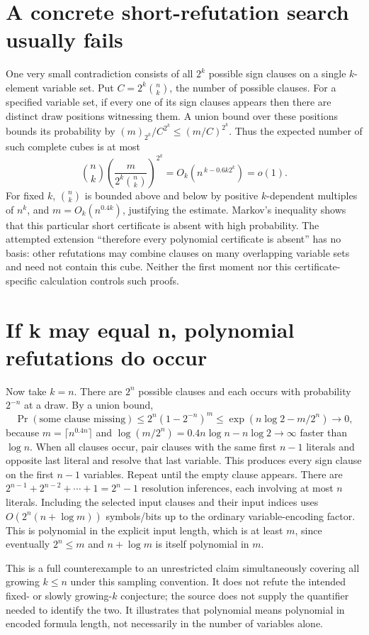 \documentclass[11pt]{article}
\begin{document}
\section{A concrete short-refutation search usually fails}
One very small contradiction consists of all $2^k$ possible sign clauses
on a single $k$-element variable set. Put
$C=2^k\binom nk$, the number of possible clauses. For a specified
variable set, if every one of its sign clauses appears then there are
distinct draw positions witnessing them. A union bound over these
positions bounds its probability by $(m)_{2^k}/C^{2^k}\le(m/C)^{2^k}$.
Thus the expected number of such complete cubes is at most
\[
\binom nk\left(\frac{m}{2^k\binom nk}\right)^{2^k}
=O_k\!\left(n^{\,k-0.6k2^k}\right)=o(1).
\]
For fixed $k$, $\binom nk$ is bounded above and below by positive
$k$-dependent multiples of $n^k$, and $m=O_k(n^{0.4k})$, justifying
the estimate. Markov's inequality shows that this particular short
certificate is absent with high probability. The attempted extension
``therefore every polynomial certificate is absent'' has no basis:
other refutations may combine clauses on many overlapping variable sets
and need not contain this cube. Neither the first moment nor this
certificate-specific calculation controls such proofs.

\section{If k may equal n, polynomial refutations do occur}
Now take $k=n$. There are $2^n$ possible clauses and each occurs with
probability $2^{-n}$ at a draw. By a union bound,
\[
\Pr(\text{some clause missing})
\le 2^n(1-2^{-n})^m
\le\exp(n\log2-m/2^n)\longrightarrow0,
\]
because $m=\lceil n^{0.4n}\rceil$ and
$\log(m/2^n)=0.4n\log n-n\log2\to\infty$ faster than $\log n$.
When all clauses occur, pair clauses with the same first $n-1$ literals
and opposite last literal and resolve that last variable. This produces
every sign clause on the first $n-1$ variables. Repeat until the empty
clause appears. There are
$2^{n-1}+2^{n-2}+\cdots+1=2^n-1$ resolution inferences, each involving
at most $n$ literals. Including the selected input clauses and their
input indices uses $O(2^n(n+\log m))$ symbols/bits up to the ordinary
variable-encoding factor. This is polynomial in the explicit input
length, which is at least $m$, since eventually $2^n\le m$ and
$n+\log m$ is itself polynomial in $m$.

This is a full counterexample to an unrestricted claim simultaneously
covering all growing $k\le n$ under this sampling convention. It does
not refute the intended fixed- or slowly growing-$k$ conjecture; the
source does not supply the quantifier needed to identify the two.
It illustrates that polynomial means polynomial in encoded formula
length, not necessarily in the number of variables alone.
\end{document}
